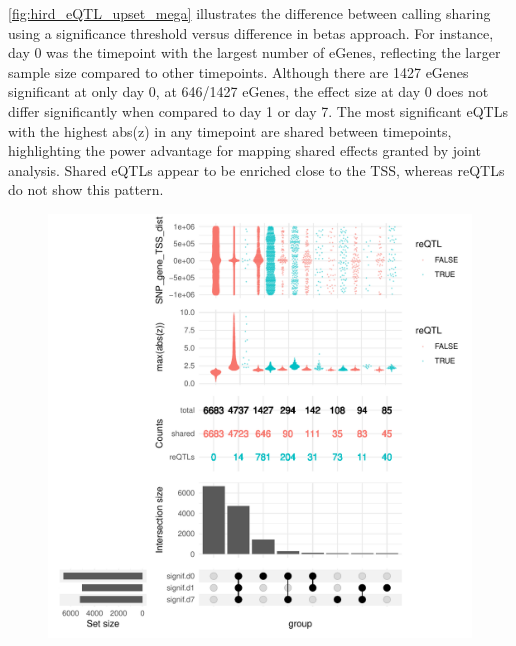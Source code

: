 \autoref{fig:hird_eQTL_upset_mega} illustrates the difference between calling sharing using a significance threshold versus difference in betas approach.
For instance, day 0 was the timepoint with the largest number of eGenes, reflecting the larger sample size compared to other timepoints.
Although there are 1427 eGenes significant at only day 0, at 646/1427 eGenes, the effect size at day 0 does not differ significantly when compared to day 1 or day 7.
The most significant \glspl{eQTL} with the highest abs(z) in any timepoint are shared between timepoints, highlighting the power advantage for mapping shared effects granted by joint analysis.
Shared \glspl{eQTL} appear to be enriched close to the \gls{TSS}, whereas \glspl{reQTL} do not show this pattern.

\begin{figure}
    \centering
    \includegraphics[width=1.0\textwidth]{mainmatter/figures/chapter_03/compare_dge_eqtl.upset.pdf}
    \caption{}
    \label{fig:hird_eQTL_upset_mega}
\end{figure}



